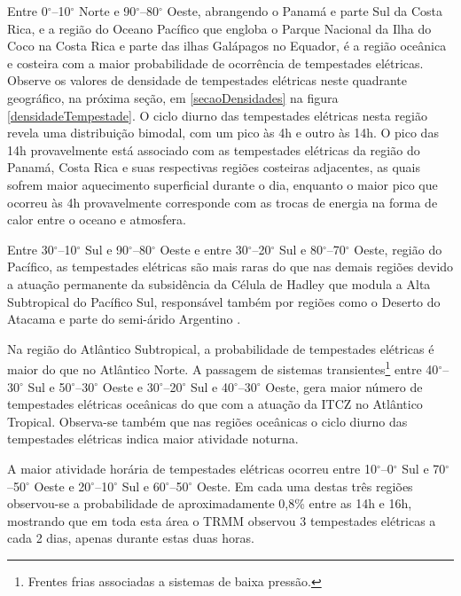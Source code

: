 Entre 0$^{\circ}$--10$^{\circ}$ Norte e 90$^{\circ}$--80$^{\circ}$ Oeste, abrangendo o Panamá e parte Sul da Costa Rica, e a região do Oceano Pacífico que engloba o Parque Nacional da Ilha do Coco na Costa Rica e parte das ilhas Galápagos no Equador, é a  região oceânica e costeira com a maior probabilidade de ocorrência de tempestades elétricas. Observe os valores de densidade de tempestades elétricas neste quadrante geográfico, na próxima seção, em \ref{secaoDensidades} na figura \ref{densidadeTempestade}. O ciclo diurno das tempestades elétricas nesta região revela uma distribuição bimodal, com um pico às 4h e outro às 14h. O pico das 14h provavelmente está associado com as tempestades elétricas da região do Panamá, Costa Rica e suas respectivas regiões costeiras adjacentes, as quais sofrem maior aquecimento superficial durante o dia, enquanto o maior pico que  ocorreu às 4h provavelmente corresponde com as trocas de energia na forma de calor entre o oceano e atmosfera.

Entre 30$^{\circ}$--10$^{\circ}$ Sul e 90$^{\circ}$--80$^{\circ}$ Oeste e entre 30$^{\circ}$--20$^{\circ}$ Sul e 80$^{\circ}$--70$^{\circ}$ Oeste, região do Pacífico, as tempestades elétricas são mais raras do que nas demais regiões devido a atuação permanente da subsidência da Célula de Hadley que modula a Alta Subtropical do Pacífico Sul, responsável também por regiões como o Deserto do Atacama e parte do semi-árido Argentino \cite{reboita2010regimes}.

Na região do Atlântico Subtropical, a probabilidade de tempestades elétricas é maior do que no Atlântico Norte. A passagem de sistemas transientes\footnote{Frentes frias associadas a sistemas de baixa pressão.} entre 40$^{\circ}$--30$^{\circ}$ Sul e 50$^{\circ}$--30$^{\circ}$ Oeste e 30$^{\circ}$--20$^{\circ}$ Sul e 40$^{\circ}$--30$^{\circ}$ Oeste, gera maior número de tempestades elétricas oceânicas do que com a atuação da ITCZ no Atlântico Tropical. Observa-se também que nas regiões oceânicas o ciclo diurno das tempestades elétricas indica maior atividade noturna.

A maior atividade horária de tempestades elétricas ocorreu entre 10$^{\circ}$--0$^{\circ}$ Sul e 70$^{\circ}$--50$^{\circ}$ Oeste e 20$^{\circ}$--10$^{\circ}$ Sul e 60$^{\circ}$--50$^{\circ}$ Oeste. Em cada uma destas três regiões observou-se a probabilidade de aproximadamente 0,8\% entre as 14h e 16h, mostrando que em toda esta área o TRMM observou 3 tempestades elétricas a cada 2 dias, apenas durante estas duas horas.

